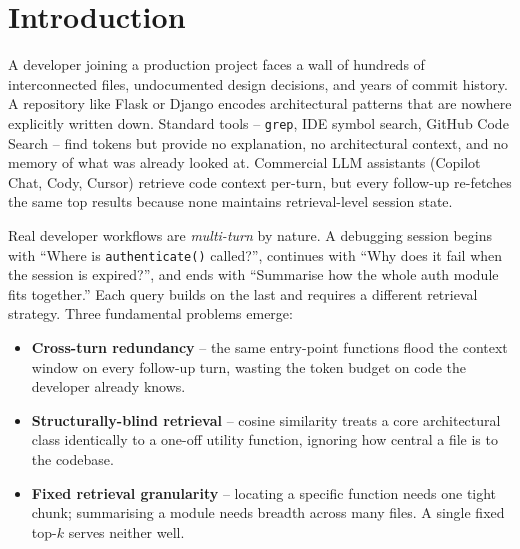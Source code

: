 \documentclass[conference]{IEEEtran}
\begin{document}
\section{Introduction}

A developer joining a production project faces a wall of hundreds of
interconnected files, undocumented design decisions, and years of commit
history. A repository like Flask or Django encodes architectural patterns
that are nowhere explicitly written down. Standard tools -- \texttt{grep},
IDE symbol search, GitHub Code Search -- find tokens but provide no
explanation, no architectural context, and no memory of what was already
looked at. Commercial LLM assistants (Copilot Chat, Cody, Cursor) retrieve
code context per-turn, but every follow-up re-fetches the same top results
because none maintains retrieval-level session state.

Real developer workflows are \emph{multi-turn} by nature. A debugging
session begins with ``Where is \texttt{authenticate()} called?'', continues
with ``Why does it fail when the session is expired?'', and ends with
``Summarise how the whole auth module fits together.'' Each query builds on
the last and requires a different retrieval strategy. Three fundamental
problems emerge:
\begin{itemize}
  \item \textbf{Cross-turn redundancy} -- the same entry-point functions
        flood the context window on every follow-up turn, wasting the
        token budget on code the developer already knows.
  \item \textbf{Structurally-blind retrieval} -- cosine similarity treats
        a core architectural class identically to a one-off utility
        function, ignoring how central a file is to the codebase.
  \item \textbf{Fixed retrieval granularity} -- locating a specific
        function needs one tight chunk; summarising a module needs breadth
        across many files. A single fixed top-$k$ serves neither well.
\end{itemize}
\end{document}
